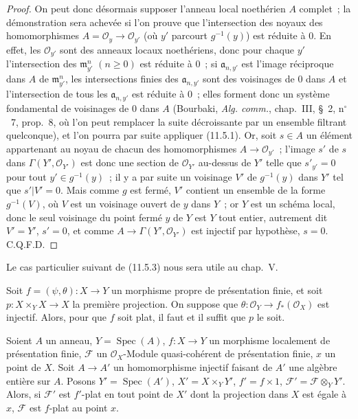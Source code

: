 \begin{proof}
On peut donc désormais supposer l'anneau local noethérien $A$ complet~; la
démonstration sera achevée si l'on prouve que l'intersection des noyaux des
homomorphismes $A=\mathcal O_y\to\mathcal O_{y'}$ (où $y'$ parcourt
$g^{-1}(y)$) est réduite à $0$. En effet, les $\mathcal O_{y'}$ sont des anneaux
locaux noethériens, donc pour chaque $y'$ l'intersection des
$\mathfrak m_{y'}^n$ $(n\geq0)$ est réduite à $0$~; si $\mathfrak a_{n,y'}$ est
l'image réciproque dans $A$ de $\mathfrak m_{y'}^n$, les intersections finies
des $\mathfrak a_{n,y'}$ sont des voisinages de $0$ dans $A$ et l'intersection de
tous les $\mathfrak a_{n,y'}$ est réduite à $0$~; elles forment donc un système
fondamental de voisinages de $0$ dans $A$ (Bourbaki, \emph{Alg. comm.}, chap.~III,
\S~2, n$^\circ$~7, prop.~8, où l'on peut remplacer la suite décroissante par un
ensemble filtrant quelconque), et l'on pourra par suite appliquer (11.5.1).
Or, soit $s\in A$ un élément appartenant au noyau de chacun des homomorphismes
$A\to\mathcal O_{y'}$~; l'image $s'$ de $s$ dans
$\Gamma(Y',\mathcal O_{Y'})$ est donc une section de $\mathcal O_{Y'}$ au-dessus
de $Y'$ telle que $s'_{y'}=0$ pour tout $y'\in g^{-1}(y)$~; il y a par suite un
voisinage $V'$ de $g^{-1}(y)$ dans $Y'$ tel que $s'|V'=0$. Mais comme $g$ est
fermé, $V'$ contient un ensemble de la forme $g^{-1}(V)$, où $V$ est un
voisinage ouvert de $y$ dans $Y$~; or $Y$ est un schéma local, donc le seul
voisinage du point fermé $y$ de $Y$ est $Y$ tout entier, autrement dit $V'=Y'$,
$s'=0$, et comme $A\to\Gamma(Y',\mathcal O_{Y'})$ est injectif par hypothèse,
$s=0$. C.Q.F.D.
\end{proof}

Le cas particulier suivant de (11.5.3) nous sera utile au chap.~V.

\begin{corollary}[11.5.4]
\label{IV.11.5.4-fr}
Soit $f=(\psi,\theta):X\to Y$ un morphisme propre de présentation finie, et
soit $p:X\times_YX\to X$ la première projection. On suppose que
$\theta:\mathcal O_Y\to f_*(\mathcal O_X)$ est injectif. Alors, pour que $f$
soit plat, il faut et il suffit que $p$ le soit.
\end{corollary}

\begin{proposition}[11.5.5]
\label{IV.11.5.5-fr}
Soient $A$ un anneau, $Y=\operatorname{Spec}(A)$, $f:X\to Y$ un morphisme
localement de présentation finie, $\mathcal F$ un $\mathcal O_X$-Module
quasi-cohérent de présentation finie, $x$ un point de $X$. Soit
$A\to A'$ un homomorphisme injectif faisant de $A'$ une algèbre entière sur $A$.
Posons $Y'=\operatorname{Spec}(A')$, $X'=X\times_Y Y'$, $f'=f\times1$,
$\mathcal F'=\mathcal F\otimes_Y Y'$. Alors, si $\mathcal F'$ est $f'$-plat en
tout point de $X'$ dont la projection dans $X$ est égale à $x$, $\mathcal F$ est
$f$-plat au point $x$.
\end{proposition}

